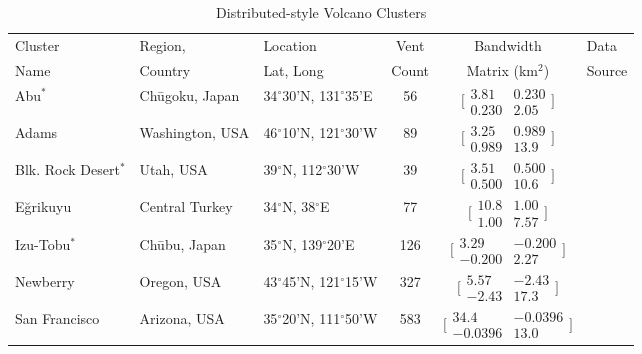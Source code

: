 \begin{table}
\centering
\caption{Distributed-style Volcano Clusters}
\begin{tabular}{p{2cm} p{2.5cm} p{2cm} c c p{4cm}}
\toprule
Cluster	&	Region, &	Location	&	Vent &	Bandwidth	&	Data\\
Name		& Country	&	Lat, Long	&	Count	&	Matrix (km$^2$)	&Source\\
\midrule
Abu$^*$		&	Ch\={u}goku, Japan	&	34$^{\circ}$30'N, 131$^{\circ}$35'E	&	56	&	$\bigl[\begin{smallmatrix} 3.81&0.230\\0.230&2.05 \end{smallmatrix}\bigr]$	&	\citet{kiyosugi2012relationship,kiyosugi2010relationships}\\
Adams		&	Washington, USA	&	46$^{\circ}$10'N, 121$^{\circ}$30'W	&	89	&	$\bigl[\begin{smallmatrix} 3.25&0.989\\0.989&13.9 \end{smallmatrix}\bigr]$	&	\citet{barron2014database}\\
Blk. Rock Desert$^*$ &	Utah, USA		&	39$^{\circ}$N, 112$^{\circ}$30'W&	39	&	$\bigl[\begin{smallmatrix} 3.51&0.500\\0.500&10.6 \end{smallmatrix}\bigr]$	&	\citet{kiyosugi2012relationship,hintz2008physical}\\
E\u{g}rikuyu	&	Central Turkey	&	34$^{\circ}$N, 38$^{\circ}$E	&	77	&	$\bigl[\begin{smallmatrix} 10.8&1.00\\1.00&7.57 \end{smallmatrix}\bigr]$	&	\citet{uslular2015size}\\
Izu-Tobu$^*$	&	Ch\={u}bu, Japan	&	35$^{\circ}$N, 139$^{\circ}$20'E	&	126	&	$\bigl[\begin{smallmatrix} 3.29&-0.200\\-0.200&2.27 \end{smallmatrix}\bigr]$	&	\citet{kiyosugi2012relationship}\\
Newberry	&	Oregon, USA	&	43$^{\circ}$45'N, 121$^{\circ}$15'W	&	327	&	$\bigl[\begin{smallmatrix} 5.57&-2.43\\-2.43&17.3 \end{smallmatrix}\bigr]$	&	\citet{bard2013database}\\
San \mbox{Francisco}	&	Arizona, USA	&	35$^{\circ}$20'N, 111$^{\circ}$50'W	&	583	&	$\bigl[\begin{smallmatrix} 34.4&-0.0396\\-0.0396&13.0 \end{smallmatrix}\bigr]$	&	\citet{harburger2014probabilistic}\\

\end{tabular}
\end{table}
